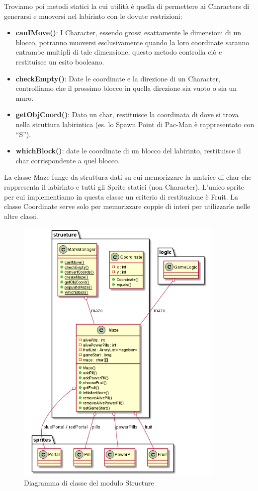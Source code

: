\documentclass[12pt,a4paper]{report}
\begin{document}
Troviamo poi metodi statici la cui utilità è quella di permettere ai Characters di generarsi e muoversi nel labirinto con le dovute restrizioni:
\begin{itemize}
 \item \textbf{canIMove()}: I Character, essendo grossi esattamente le dimensioni di un blocco, potranno muoversi esclusivamente quando la loro coordinate saranno entrambe multipli di tale dimensione, questo metodo controlla ciò e restituisce un esito booleano.
 \item \textbf{checkEmpty()}: Date le coordinate e la direzione di un Character, controlliamo che il prossimo blocco in quella direzione sia vuoto o sia un muro.
 \item \textbf{getObjCoord()}: Dato un char, restituisce la coordinata di dove si trova nella struttura labirintica (es. lo Spawn Point di Pac-Man è rappresentato con “S”).
 \item \textbf{whichBlock()}: date le coordinate di un blocco del labirinto, restituisce il char corrispondente a quel blocco.
\end{itemize}

La classe Maze funge da struttura dati su cui memorizzare la matrice di char che rappresenta il labirinto e tutti gli Sprite statici (non Character). L’unico sprite per cui implementiamo in questa classe un criterio di restituzione è Fruit.
La classe Coordinate serve solo per memorizzare coppie di interi per utilizzarle nelle altre classi.\newpage


\begin{figure}[tb]
\begin{center}
  \includegraphics[width=10cm]{structure}
\end{center}
  \caption{Diagramma di classe del modulo Structure}
  \label{fig:structure}
\end{figure}
\end{document}
